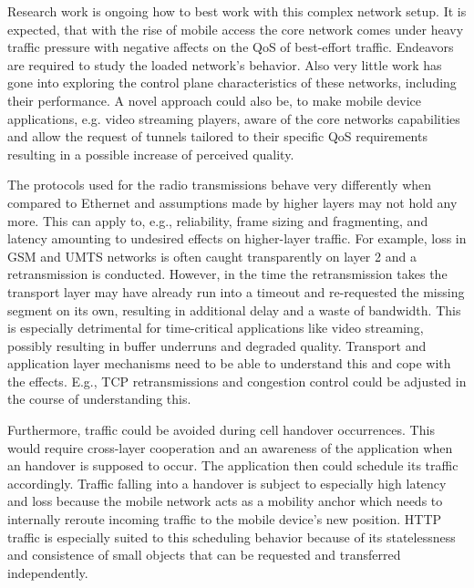 Research work is ongoing how to best work with this complex network setup. It is expected, that with the rise of mobile access the core network comes under heavy traffic pressure with negative affects on the QoS of best-effort traffic. Endeavors are required to study the loaded network's behavior. Also very little work has gone into exploring the control plane characteristics of these networks, including their performance. A novel approach could also be, to make mobile device applications, e.g. video streaming players, aware of the core networks capabilities and allow the request of tunnels tailored to their specific QoS requirements resulting in a possible increase of perceived quality.


The protocols used for the radio transmissions behave very differently when compared to Ethernet and assumptions made by higher layers may not hold any more. This can apply to, e.g., reliability, frame sizing and fragmenting, and latency amounting to undesired effects on higher-layer traffic. For example, loss in GSM and UMTS networks is often caught transparently on layer 2 and a retransmission is conducted. However, in the time the retransmission takes the transport layer may have already run into a timeout and re-requested the missing segment on its own, resulting in additional delay and a waste of bandwidth. This is especially detrimental for time-critical applications like video streaming, possibly resulting in buffer underruns and degraded quality. Transport and application layer mechanisms need to be able to understand this and cope with the effects. E.g., TCP retransmissions and congestion control could be adjusted in the course of understanding this.

Furthermore, traffic could be avoided during cell handover occurrences. This would require cross-layer cooperation and an awareness of the application when an handover is supposed to occur. The application then could schedule its traffic accordingly. Traffic falling into a handover is subject to especially high latency and loss because the mobile network acts as a mobility anchor which needs to internally reroute incoming traffic to the mobile device's new position. HTTP traffic is especially suited to this scheduling behavior because of its statelessness and consistence of small objects that can be requested and transferred independently.





